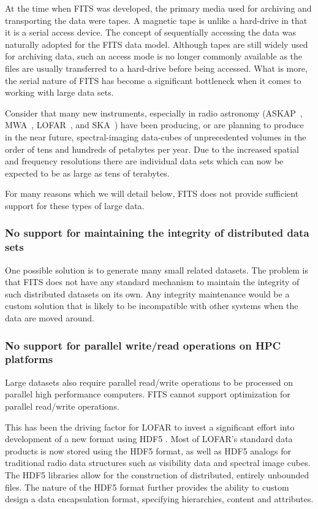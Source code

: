\documentclass[final,authoryear,5p,times,twocolumn]{elsarticle}
\begin{document}
{{At the time when FITS was developed, the primary media used for
archiving and transporting the data were tapes. A magnetic tape is
unlike a hard-drive in that it is a serial access device.  The concept
of sequentially accessing the data was naturally adopted for the FITS data
model.  Although tapes are still widely used for archiving data,
such an access mode is no longer commonly available as the files are usually
transferred to a hard-drive before being accessed. What is more, the
serial nature of FITS has become a significant bottleneck when it comes
to working with large data sets.


Consider that many new instruments, especially in radio astronomy
(ASKAP~\citep{2009IEEEP..97.1507D},
MWA~\citep{2013PASA...30....7T}, LOFAR~\citep{2013A&A...556A...2V}, and SKA~\citep{ska-exascale})
have been producing, or are planning to produce in the near future,
spectral-imaging data-cubes of unprecedented volumes in the order of
tens and hundreds of petabytes per year. Due to the increased spatial and frequency
resolutions there are individual data sets which can now be expected to be as
large as tens of terabytes.


For many reasons which we will detail below, FITS does not provide sufficient
support for these types of large data.

\subsubsection{No support for maintaining the integrity of distributed data sets}

One possible solution is to generate many small related datasets.
The problem is that FITS does not have any standard mechanism to maintain the
integrity of such distributed datasets on its own. Any integrity
maintenance would be a custom solution that is likely to be
incompatible with other systems when the data are moved around.

\subsubsection{No support for parallel write/read operations on HPC platforms}
\label{subsection_hpc_io}

Large datasets also require parallel read/write operations to be processed on
parallel high performance computers. FITS cannot support optimization for
parallel read/write operations.

This has been the driving factor for LOFAR to
invest a significant effort into development of a new format using
HDF5  \citep{2012ASPC..461..283A}. Most of LOFAR's standard data products
is now stored using the HDF5 format, as well as HDF5 analogs for traditional radio data
structures such as visibility data and spectral image cubes. The HDF5 libraries allow
for the construction of distributed, entirely unbounded files. The nature of the HDF5
format further provides the ability to custom design a data encapsulation format,
specifying hierarchies, content and attributes.

}}
\end{document}
